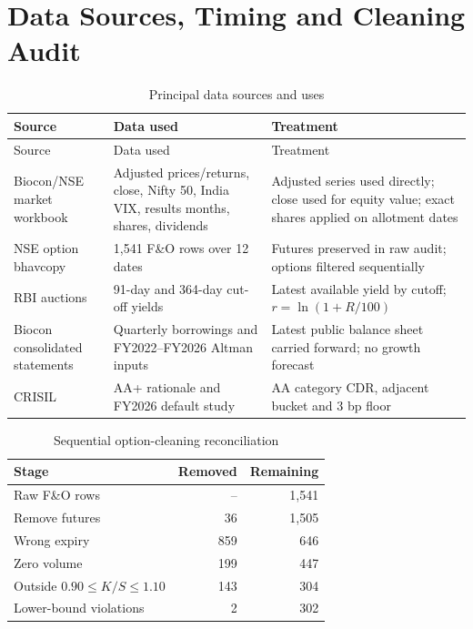 \documentclass[10pt,a4paper]{article}
\begin{document}
\section{Data Sources, Timing and Cleaning Audit}\label{app:data}
\small
\begin{longtable}{p{}p{}p{}}
\caption{Principal data sources and uses}\\
\toprule Source & Data used & Treatment\\\midrule\endfirsthead
\toprule Source & Data used & Treatment\\\midrule\endhead
Biocon/NSE market workbook & Adjusted prices/returns, close, Nifty 50, India VIX, results months, shares, dividends & Adjusted series used directly; close used for equity value; exact shares applied on allotment dates\\
NSE option bhavcopy & 1,541 F\&O rows over 12 dates & Futures preserved in raw audit; options filtered sequentially\\
RBI auctions & 91-day and 364-day cut-off yields & Latest available yield by cutoff; $r=\ln(1+R/100)$\\
Biocon consolidated statements & Quarterly borrowings and FY2022--FY2026 Altman inputs & Latest public balance sheet carried forward; no growth forecast\\
CRISIL & AA+ rationale and FY2026 default study & AA category CDR, adjacent bucket and 3 bp floor\\
\bottomrule
\end{longtable}

\begin{table}[H]
\centering
\caption{Sequential option-cleaning reconciliation}
\begin{tabular}{lrr}
\toprule Stage & Removed & Remaining\\
\midrule
Raw F\&O rows & -- & 1,541\\
Remove futures & 36 & 1,505\\
Wrong expiry & 859 & 646\\
Zero volume & 199 & 447\\
Outside $0.90\leq K/S\leq1.10$ & 143 & 304\\
Lower-bound violations & 2 & 302\\
\bottomrule
\end{tabular}
\end{table}
\end{document}
